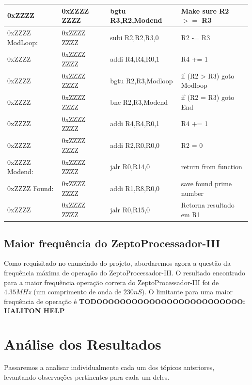 \documentclass[12pt]{article}
\begin{document}
\begin{table}[H]
\begin{tabular}{|l|l|l|l|}
        0xZZZZ         & 0xZZZZ ZZZZ & bgtu R3,R2,Modend  & Make sure R2 $>=$ R3        \\\hline
        0xZZZZ ModLoop:& 0xZZZZ ZZZZ & subi R2,R2,R3,0    & R2 -= R3                    \\\hline
        0xZZZZ         & 0xZZZZ ZZZZ & addi R4,R4,R0,1    & R4 += 1                     \\\hline
        0xZZZZ         & 0xZZZZ ZZZZ & bgtu R2,R3,Modloop & if (R2 > R3) goto Modloop   \\\hline
        0xZZZZ         & 0xZZZZ ZZZZ & bne  R2,R3,Modend  & if (R2 \!= R3) goto End     \\\hline
        0xZZZZ         & 0xZZZZ ZZZZ & addi R4,R4,R0,1    & R4 += 1                     \\\hline
        0xZZZZ         & 0xZZZZ ZZZZ & addi R2,R0,R0,0    & R2 = 0                      \\\hline
        0xZZZZ Modend: & 0xZZZZ ZZZZ & jalr R0,R14,0      & return from function        \\\hline
        0xZZZZ Found:  & 0xZZZZ ZZZZ & addi R1,R8,R0,0    & save found prime number     \\\hline
        0xZZZZ         & 0xZZZZ ZZZZ & jalr R0,R15,0      & Retorna resultado em R1     \\\hline
    \end{tabular}\label{tab:programs:primo}
\end{table}



\subsection{Maior frequência do ZeptoProcessador-III}\label{sec:programs:frequency}

Como requisitado no enunciado do projeto, abordaremos agora a questão da
frequência máxima de operação do ZeptoProcessador-III. O resultado encontrado
para a maior frequência operação correra do ZeptoProcessador-III foi de
$4.35MHz$ (um comprimento de onda de $230nS$). O limitante para uma maior
frequência de operação é \textbf{TODOOOOOOOOOOOOOOOOOOOOOOOOO: UALITON HELP}

\section{Análise dos Resultados}\label{sec:resultados}

Passaremos a analisar individualmente cada um dos tópicos anteriores, levantando
observações pertinentes para cada um deles.
\end{document}
